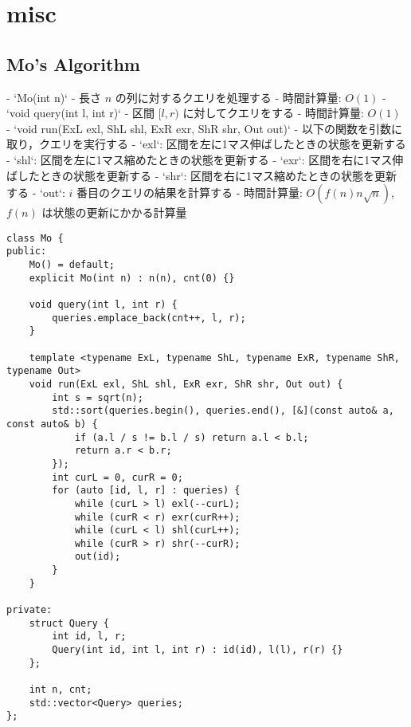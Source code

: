 \section{misc}

\subsection{Mo's Algorithm}

\begin{small}
\begin{markdown}
- `Mo(int n)`
    - 長さ $n$ の列に対するクエリを処理する
    - 時間計算量: $O(1)$
- `void query(int l, int r)`
    - 区間 $[l, r)$ に対してクエリをする
    - 時間計算量: $O(1)$
- `void run(ExL exl, ShL shl, ExR exr, ShR shr, Out out)`
    - 以下の関数を引数に取り，クエリを実行する
        - `exl`: 区間を左に1マス伸ばしたときの状態を更新する
        - `shl`: 区間を左に1マス縮めたときの状態を更新する
        - `exr`: 区間を右に1マス伸ばしたときの状態を更新する
        - `shr`: 区間を右に1マス縮めたときの状態を更新する
        - `out`: $i$ 番目のクエリの結果を計算する
    - 時間計算量: $O(f(n)n\sqrt{n})$, $f(n)$ は状態の更新にかかる計算量
\end{markdown}
\end{small}

\begin{lstlisting}
class Mo {
public:
    Mo() = default;
    explicit Mo(int n) : n(n), cnt(0) {}

    void query(int l, int r) {
        queries.emplace_back(cnt++, l, r);
    }

    template <typename ExL, typename ShL, typename ExR, typename ShR, typename Out>
    void run(ExL exl, ShL shl, ExR exr, ShR shr, Out out) {
        int s = sqrt(n);
        std::sort(queries.begin(), queries.end(), [&](const auto& a, const auto& b) {
            if (a.l / s != b.l / s) return a.l < b.l;
            return a.r < b.r;
        });
        int curL = 0, curR = 0;
        for (auto [id, l, r] : queries) {
            while (curL > l) exl(--curL);
            while (curR < r) exr(curR++);
            while (curL < l) shl(curL++);
            while (curR > r) shr(--curR);
            out(id);
        }
    }

private:
    struct Query {
        int id, l, r;
        Query(int id, int l, int r) : id(id), l(l), r(r) {}
    };

    int n, cnt;
    std::vector<Query> queries;
};
\end{lstlisting}

